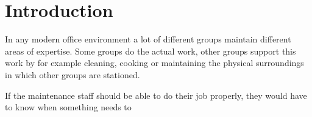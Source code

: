 \section{Introduction}
In any modern office environment a lot of different groups maintain different areas of expertise. Some groups do the actual work, other groups support this work by for example cleaning, cooking or maintaining the physical surroundings in which other groups are stationed.

If the maintenance staff should be able to do their job properly, they would have to know when something needs to 